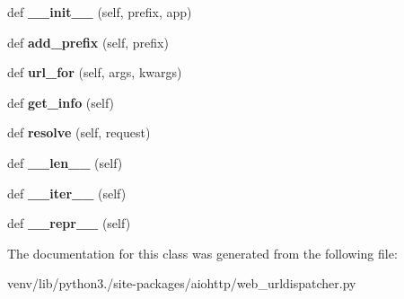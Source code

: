 \begin{DoxyCompactItemize}
\item 
\mbox{\label{classaiohttp_1_1web__urldispatcher_1_1_prefixed_sub_app_resource_a04746ff075059c19e1703b7c4589c497}} 
def {\bfseries \+\_\+\+\_\+init\+\_\+\+\_\+} (self, prefix, app)
\item 
\mbox{\label{classaiohttp_1_1web__urldispatcher_1_1_prefixed_sub_app_resource_aeda85d30d6f7c638ed3a5fcd0692dba2}} 
def {\bfseries add\+\_\+prefix} (self, prefix)
\item 
\mbox{\label{classaiohttp_1_1web__urldispatcher_1_1_prefixed_sub_app_resource_a25420447f2097d9abc43aaec17ec4163}} 
def {\bfseries url\+\_\+for} (self, args, kwargs)
\item 
\mbox{\label{classaiohttp_1_1web__urldispatcher_1_1_prefixed_sub_app_resource_a090530da1c36380e587ba7e17487da41}} 
def {\bfseries get\+\_\+info} (self)
\item 
\mbox{\label{classaiohttp_1_1web__urldispatcher_1_1_prefixed_sub_app_resource_a060a00db9102db460569decdb634ab85}} 
def {\bfseries resolve} (self, request)
\item 
\mbox{\label{classaiohttp_1_1web__urldispatcher_1_1_prefixed_sub_app_resource_ab5fa55cba97433c76fb7daad8ccd097a}} 
def {\bfseries \+\_\+\+\_\+len\+\_\+\+\_\+} (self)
\item 
\mbox{\label{classaiohttp_1_1web__urldispatcher_1_1_prefixed_sub_app_resource_a7aadf13f7b75cc90e58ec1012ad00c1a}} 
def {\bfseries \+\_\+\+\_\+iter\+\_\+\+\_\+} (self)
\item 
\mbox{\label{classaiohttp_1_1web__urldispatcher_1_1_prefixed_sub_app_resource_a0dd61150ebe637088e14ae79898753ff}} 
def {\bfseries \+\_\+\+\_\+repr\+\_\+\+\_\+} (self)
\end{DoxyCompactItemize}


The documentation for this class was generated from the following file\+:\begin{DoxyCompactItemize}
\item 
venv/lib/python3./site-\/packages/aiohttp/web\+\_\+urldispatcher.\+py\end{DoxyCompactItemize}
